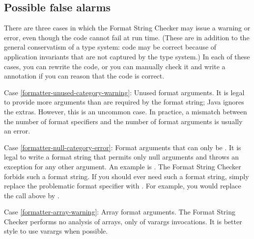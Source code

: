 \subsection{Possible false alarms\label{formatter-false-alarms}}

There are three cases in which the Format String Checker may issue a
warning or error, even though the code cannot fail at run time.
(These are in addition to the general conservatism of a type system:  code
may be correct because of application invariants that are not captured by
the type system.)
In each of these cases, you can rewrite the code, or you can manually check
it and write a  annotation if you can reason that
the code is correct.


Case \ref{formatter-unused-category-warning}:
  Unused format arguments.  It is legal to provide more arguments than are
  required by the format string; Java ignores the extras.  However, this is
  an uncommon case.  In practice, a mismatch between the number of format
  specifiers and the number of format arguments is usually an error.

Case \ref{formatter-null-category-error}:
  Format arguments that can only be .
  It is legal to write a format string that permits only null arguments and
  throws an exception for any other argument.  An example is
  .
  The Format String Checker forbids such a format string.
  If you should ever need such a format string, simply replace the problematic
  format specifier with .  For example, you would replace the
  call above by .

Case \ref{formatter-array-warning}:
  Array format arguments.
  The Format String Checker performs no analysis of
  arrays, only of varargs invocations.  It is better style to use varargs
  when possible.


